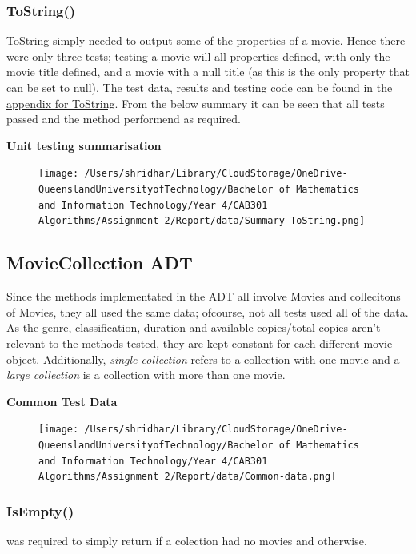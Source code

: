 \documentclass[a4paper]{article}
\begin{document}
\subsubsection{ToString{()}}
ToString simply needed to output some of the properties of a movie. Hence there were only three tests; testing a movie will all properties defined, with only the movie title defined, and a movie with a null title (as this is the only property that can be set to null). The test data, results and testing code can be found in the \hyperlink{subsubsection.5.1.2}{appendix for ToString}. From the below summary it can be seen that all tests passed and the method performend as required.
\vspace{3mm}

\noindent
\textbf{Unit testing summarisation}
\begin{figure}[H]
   \texttt{[image: /Users/shridhar/Library/CloudStorage/OneDrive-QueenslandUniversityofTechnology/Bachelor of Mathematics and Information Technology/Year 4/CAB301 Algorithms/Assignment 2/Report/data/Summary-ToString.png]}
\end{figure}

\subsection{MovieCollection ADT}
Since the methods implementated in the  ADT all involve Movies and collecitons of Movies, they all used the same data; ofcourse, not all tests used all of the data. As the genre, classification, duration and available copies/total copies aren't relevant to the methods tested, they are kept constant for each different movie object. Additionally, \textit{single collection} refers to a collection with one movie and a \textit{large collection} is a collection with more than one movie.
\vspace{3mm}

\noindent
\textbf{Common Test Data}
\begin{figure}[H]
    \centering
    \texttt{[image: /Users/shridhar/Library/CloudStorage/OneDrive-QueenslandUniversityofTechnology/Bachelor of Mathematics and Information Technology/Year 4/CAB301 Algorithms/Assignment 2/Report/data/Common-data.png]}
\end{figure}

\subsubsection{IsEmpty{()}}
 was required to simply return  if a colection had no movies and  otherwise.
\end{document}
